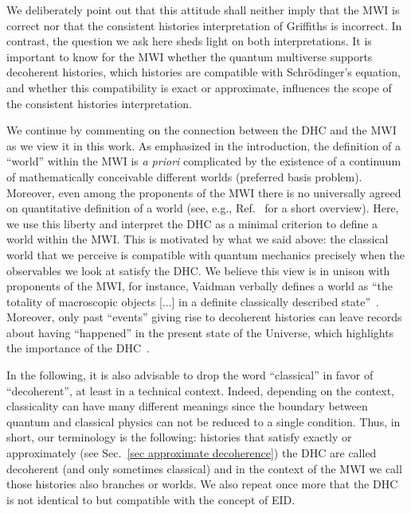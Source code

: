 \documentclass[pre,onecolumn,12pt,aps,longbibliography,nofootinbib]{revtex4-2}
\newcommand{\blue}[1]{#1}
\begin{document}
We deliberately point out that this attitude shall neither imply that the MWI is correct nor that the consistent histories interpretation of Griffiths is incorrect. In contrast, the question we ask here sheds light on both interpretations. It is important to know for the MWI whether the quantum multiverse supports decoherent histories, which histories are compatible with Schr\"odinger's equation, and whether this compatibility is exact or approximate, influences the scope of the consistent histories interpretation.

We continue by commenting on the connection between the DHC and the MWI as we view it in this work. As emphasized in the introduction, the definition of a ``world'' within the MWI is \emph{a priori} complicated by the existence of a continuum of mathematically conceivable different worlds (preferred basis problem). Moreover, even among the proponents of the MWI there is no universally agreed on quantitative definition of a world \blue{(see, e.g., Ref.~\cite{JessRiedelBlog2023} for a short overview)}. Here, we use this liberty and interpret the DHC as a minimal criterion to define a world within the MWI. This is motivated by what we said above: the classical world that we perceive is compatible with quantum mechanics precisely when the observables we look at satisfy the DHC. We believe this view is in unison with proponents of the MWI, for instance, Vaidman verbally defines a world as ``the totality of macroscopic objects [...] in a definite classically described state''~\cite{Vaidman2021}. Moreover, \blue{only past ``events'' giving rise to decoherent histories can leave records about having ``happened'' in the present state of the Universe, which highlights the importance of the DHC}~\cite{AlbrechtPRD1992, GellMannHartlePRD1993, FinkelsteinPRD1993, PazZurekPRD1993, HalliwellPRD1999, DoddHalliwellPRD2003, RiedelZurekZwolakPRA2016, HartleArXiv2016}.

In the following, it is also advisable to drop the word ``classical'' in favor of ``decoherent'', at least in a technical context. Indeed, depending on the context, classicality can have many different meanings since the boundary between quantum and classical physics can not be reduced to a single condition. Thus, in short, our terminology is the following: histories that satisfy exactly or approximately (see Sec.~\ref{sec approximate decoherence}) the DHC are called decoherent (and only sometimes classical) and in the context of the MWI we call those histories also branches or worlds. We also repeat once more that the DHC is not identical to but compatible with the concept of EID.
\end{document}
